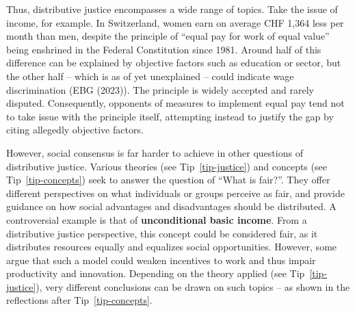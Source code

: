 \documentclass[
  a4paper,
  openany]{book}
\begin{document}
Thus, distributive justice encompasses a wide range of topics. Take the
issue of income, for example. In Switzerland, women earn on average CHF
1,364 less per month than men, despite the principle of ``equal pay for
work of equal value'' being enshrined in the Federal Constitution since
1981. Around half of this difference can be explained by objective
factors such as education or sector, but the other half -- which is as
of yet unexplained -- could indicate wage discrimination (EBG (2023)).
The principle is widely accepted and rarely disputed. Consequently,
opponents of measures to implement equal pay tend not to take issue with
the principle itself, attempting instead to justify the gap by citing
allegedly objective factors.

However, social consensus is far harder to achieve in other questions of
distributive justice. Various theories (see Tip~\ref{tip-justice}) and
concepts (see Tip~\ref{tip-concepts}) seek to answer the question of
``What is fair?''. They offer different perspectives on what individuals
or groups perceive as fair, and provide guidance on how social
advantages and disadvantages should be distributed. A controversial
example is that of \textbf{unconditional basic income}. From a
distributive justice perspective, this concept could be considered fair,
as it distributes resources equally and equalizes social opportunities.
However, some argue that such a model could weaken incentives to work
and thus impair productivity and innovation. Depending on the theory
applied (see Tip~\ref{tip-justice}), very different conclusions can be
drawn on such topics -- as shown in the reflections after
Tip~\ref{tip-concepts}.
\end{document}
